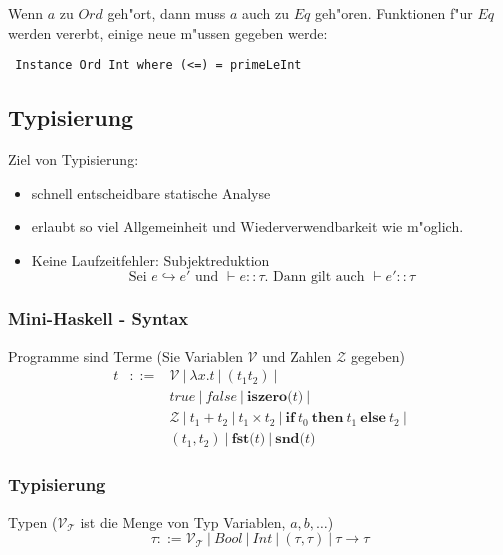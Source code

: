\documentclass[german,10pt, a4paper, twocolumn]{scrartcl}
\theoremstyle{definition}
\theoremstyle{remark}
\begin{document}
Wenn $a$ zu $Ord$ geh"ort, dann muss $a$ auch zu $Eq$ geh"oren. Funktionen f"ur $Eq$ werden vererbt, einige neue m"ussen gegeben werde:
\begin{verbatim}
 Instance Ord Int where (<=) = primeLeInt
\end{verbatim}

\subsection{Typisierung}

Ziel von Typisierung:
\begin{itemize}
	\item schnell entscheidbare statische Analyse
	\item erlaubt so viel Allgemeinheit und Wiederverwendbarkeit wie m"oglich.
	\item Keine Laufzeitfehler: Subjektreduktion
		\begin{displaymath}
			\mbox{Sei } e \hookrightarrow e' \mbox{ und } \vdash e :: \tau\mbox{. Dann gilt auch } \vdash e' :: \tau
		\end{displaymath}
\end{itemize}

\subsubsection{Mini-Haskell - Syntax}

Programme sind Terme (Sie Variablen $\mathcal{V}$ und Zahlen $\mathcal{Z}$ gegeben)
\begin{eqnarray}
	t&	::= &	\mathcal{V}\ |\ \lambda x.t\ |\ (t_1 t_2)\ | \nonumber \\
	 &	&	true\ |\ false\ |\ \mathbf{iszero(}t\mathbf{)}\ | \nonumber \\
	 &	&	\mathcal{Z}\ |\ t_1 + t_2\ |\ t_1 \times t_2\ |\ \mathbf{if}\ t_0\ \mathbf{then}\ t_1\ \mathbf{else}\ t_2\ | \nonumber \\
	 &	&	(t_1,t_2)\ |\ \mathbf{fst(}t\mathbf{)}\ |\ \mathbf{snd(}t\mathbf{)} \nonumber
\end{eqnarray}

\subsubsection{Typisierung}

Typen ($\mathcal{V}_{\mathcal{T}}$ ist die Menge von Typ Variablen, $a, b, \ldots$)
\begin{displaymath}
	\tau ::= \mathcal{V}_{\mathcal{T}}\ |\ Bool\ |\ Int\ |\ (\tau, \tau)\ |\ \tau \rightarrow \tau
\end{displaymath}
\end{document}
